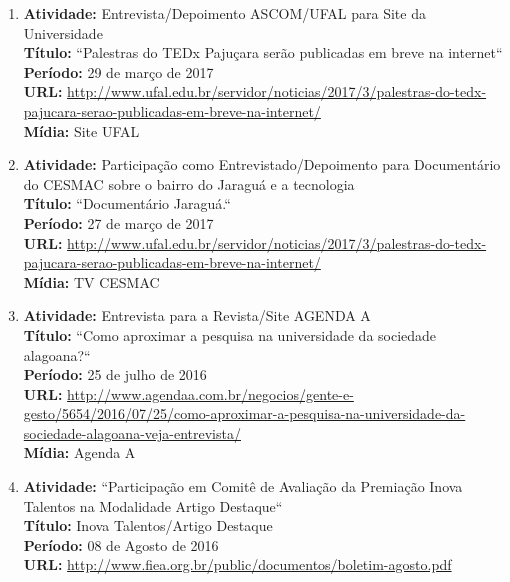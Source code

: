 \documentclass[a4paper,oneside,10pt]{article}
\newcounter{document}%
\begin{document}
\begin{enumerate}
\renewcommand{\labelenumi}{{\large\bfseries\arabic{enumi}.}}

\item   \textbf{Atividade:} Entrevista/Depoimento ASCOM/UFAL para Site da Universidade 
  \mbox{}\\
        \textbf{Título:} ``Palestras do TEDx Pajuçara serão publicadas em breve na internet``\\
        \textbf{Período:} 29 de março de 2017\\
        \textbf{URL:} \url{http://www.ufal.edu.br/servidor/noticias/2017/3/palestras-do-tedx-pajucara-serao-publicadas-em-breve-na-internet/}\\
        \textbf{Mídia:} Site UFAL\\
        
 \item   \textbf{Atividade:}  Participação como Entrevistado/Depoimento para Documentário do CESMAC sobre o bairro do Jaraguá e a tecnologia
  \mbox{} \\
        \textbf{Título:} ``Documentário Jaraguá.``\\
        \textbf{Período:}  27 de março de 2017\\
        \textbf{URL:} \url{http://www.ufal.edu.br/servidor/noticias/2017/3/palestras-do-tedx-pajucara-serao-publicadas-em-breve-na-internet/}\\
        \textbf{Mídia:} TV CESMAC\\   
        
\item   \textbf{Atividade:}  Entrevista para a Revista/Site AGENDA A
  \mbox{} \\
        \textbf{Título:} ``Como aproximar a pesquisa na universidade da sociedade alagoana?``\\
        \textbf{Período:}  25 de julho de 2016\\
        \textbf{URL:} \url{http://www.agendaa.com.br/negocios/gente-e-gesto/5654/2016/07/25/como-aproximar-a-pesquisa-na-universidade-da-sociedade-alagoana-veja-entrevista/}\\
        \textbf{Mídia:}  Agenda A\\   
             
\item   \textbf{Atividade:} ``Participação em Comitê de Avaliação da Premiação Inova Talentos na Modalidade Artigo Destaque`` 
  \mbox{} \\
        \textbf{Título:} Inova Talentos/Artigo Destaque\\
        \textbf{Período:} 08 de Agosto de 2016 \\
        \textbf{URL:} \url{http://www.fiea.org.br/public/documentos/boletim-agosto.pdf}\\
        

\end{enumerate}
\end{document}
